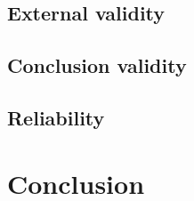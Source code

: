\documentclass[10pt,conference]{IEEEtran}
\begin{document}
\subsection*{External validity}

\subsection*{Conclusion validity}

\subsection*{Reliability}

\section{Conclusion}
\label{sec:conclusion}

\end{document}
